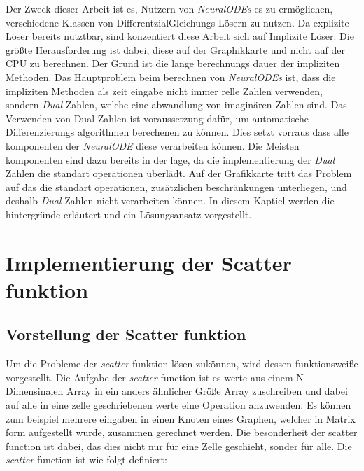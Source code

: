 Der Zweck dieser Arbeit ist es, Nutzern von \textit{NeuralODEs} es zu ermöglichen, 
verschiedene Klassen von DifferentzialGleichungs-Lösern zu nutzen.
Da explizite Löser bereits nutztbar, 
sind konzentiert diese Arbeit sich auf Implizite Löser. 
Die größte Herausforderung ist dabei, 
diese auf der Graphikkarte und nicht auf der CPU zu berechnen.
Der Grund ist die lange berechnungs dauer der impliziten Methoden.
Das Hauptproblem beim berechnen von \textit{NeuralODEs} ist, 
dass die impliziten Methoden als zeit eingabe nicht immer relle Zahlen verwenden,
sondern \textit{Dual} Zahlen, welche eine abwandlung von imaginären Zahlen sind.
Das Verwenden von Dual Zahlen ist voraussetzung dafür, 
um automatische Differenzierungs algorithmen berechenen zu können.
Dies setzt vorraus dass alle komponenten der \textit{NeuralODE} diese verarbeiten können.
Die Meisten komponenten sind dazu bereits in der lage, 
da die implementierung der \textit{Dual} Zahlen
die standart operationen überlädt.
Auf der Grafikkarte tritt das Problem auf das die standart operationen, 
zusätzlichen beschränkungen unterliegen, 
und deshalb \textit{Dual} Zahlen nicht verarbeiten können.
In diesem Kaptiel werden die hintergründe erläutert und ein Lösungsansatz vorgestellt.


\section{Implementierung der Scatter funktion}
\subsection{Vorstellung der Scatter funktion}

Um die Probleme der \textit{scatter} funktion lösen zukönnen, 
wird dessen funktionsweiße vorgestellt.
Die Aufgabe der \textit{scatter} function ist es werte aus einem N-Dimensinalen Array in ein anders 
ähnlicher Größe Array zuschreiben und dabei auf alle in eine zelle geschriebenen werte eine Operation anzuwenden.
Es können zum beispiel mehrere eingaben in einen Knoten eines Graphen, 
welcher in Matrix form aufgestellt wurde,
zusammen gerechnet werden.
Die besonderheit der scatter function ist dabei, 
das dies nicht nur für eine Zelle geschieht, 
sonder für alle.
Die \textit{scatter} function ist wie folgt definiert:

